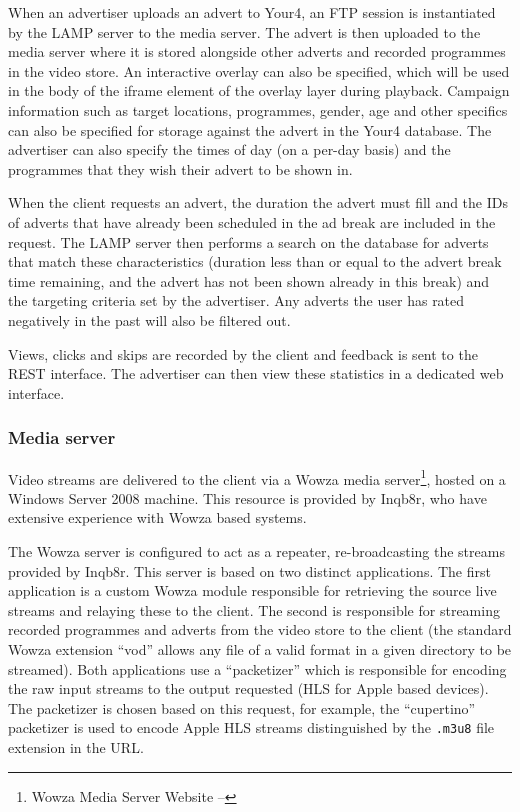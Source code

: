 When an advertiser uploads an advert to Your4, an FTP session is instantiated by the LAMP server to the media server. The advert is then uploaded to the media server where it is stored alongside other adverts and recorded programmes in the video store. An interactive overlay can also be specified, which will be used in the body of the iframe element of the overlay layer during playback. Campaign information such as target locations, programmes, gender, age and other specifics can also be specified for storage against the advert in the Your4 database. The advertiser can also specify the times of day (on a per-day basis) and the programmes that they wish their advert to be shown in.

When the client requests an advert, the duration the advert must fill and the IDs of adverts that have already been scheduled in the ad break are included in the request. The LAMP server then performs a search on the database for adverts that match these characteristics (duration less than or equal to the advert break time remaining, and the advert has not been shown already in this break) and the targeting criteria set by the advertiser. Any adverts the user has rated negatively in the past will also be filtered out.

Views, clicks and skips are recorded by the client and feedback is sent to the REST interface. The advertiser can then view these statistics in a dedicated web interface.

\subsubsection{Media server}

Video streams are delivered to the client via a Wowza media server\footnote{Wowza Media Server Website -- }, hosted on a Windows Server 2008 machine. This resource is provided by Inqb8r, who have extensive experience with Wowza based systems.

The Wowza server is configured to act as a repeater, re-broadcasting the streams provided by Inqb8r. This server is based on two distinct applications. The first application is a custom Wowza module responsible for retrieving the source live streams and relaying these to the client. The second is responsible for streaming recorded programmes and adverts from the video store to the client (the standard Wowza extension ``vod'' allows any file of a valid format in a given directory to be streamed). Both applications use a ``packetizer'' which is responsible for encoding the raw input streams to the output requested (HLS for Apple based devices). The packetizer is chosen based on this request, for example, the ``cupertino'' packetizer is used to encode Apple HLS streams distinguished by the \texttt{.m3u8} file extension in the URL.

